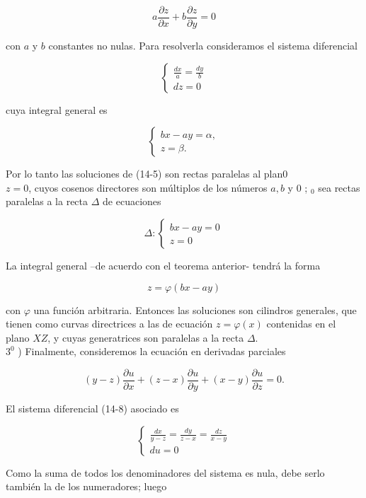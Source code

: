 \documentclass[10pt]{article}
\theoremstyle{plain}
\theoremstyle{definition}
\theoremstyle{remark}
\begin{document}
$$
a \frac{\partial z}{\partial x}+b \frac{\partial z}{\partial y}=0
$$

con $a$ y $b$ constantes no nulas. Para resolverla consideramos el sistema diferencial

$$
\left\{\begin{array}{l}
\frac{d x}{a}=\frac{d y}{b} \\
d z=0
\end{array}\right.
$$

cuya integral general es

$$
\left\{\begin{array}{l}
b x-a y=\alpha, \\
z=\beta .
\end{array}\right.
$$

Por lo tanto las soluciones de (14-5) son rectas paralelas al plan0\\
$z=0$, cuyos cosenos directores son múltiplos de los números $a, b$ y 0 ; ${ }_{0}$ sea rectas paralelas a la recta $\Delta$ de ecuaciones

$$
\Delta:\left\{\begin{array}{l}
b x-a y=0 \\
z=0
\end{array}\right.
$$

La integral general --de acuerdo con el teorema anterior- tendrá la forma

$$
z=\varphi(b x-a y)
$$

con $\varphi$ una función arbitraria. Entonces las soluciones son cilindros generales, que tienen como curvas directrices a las de ecuación $z=\varphi(x)$ contenidas en el plano $X Z$, y cuyas generatrices son paralelas a la recta $\Delta$.\\
$3^{0}$ ) Finalmente, consideremos la ecuación en derivadas parciales


\begin{equation*}
(y-z) \frac{\partial u}{\partial x}+(z-x) \frac{\partial u}{\partial y}+(x-y) \frac{\partial u}{\partial z}=0 . \tag{14-11}
\end{equation*}


El sistema diferencial (14-8) asociado es

\[
\left\{\begin{array}{l}
\frac{d x}{y-z}=\frac{d y}{z-x}=\frac{d z}{x-y}  \tag{14-12}\\
d u=0
\end{array}\right.
\]

Como la suma de todos los denominadores del sistema es nula, debe serlo también la de los numeradores; luego
\end{document}
